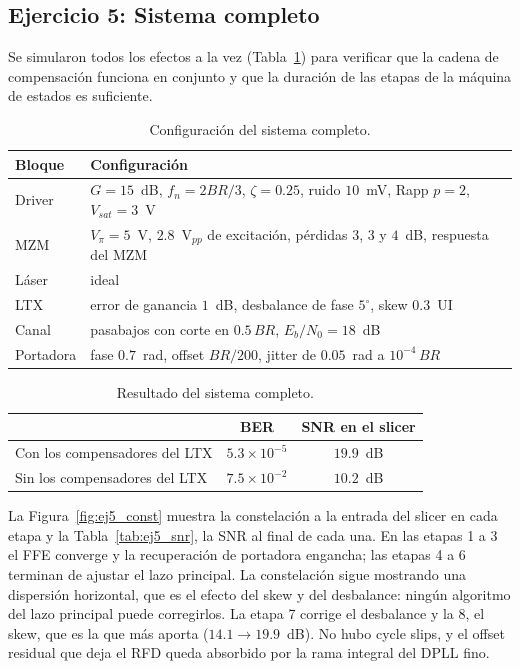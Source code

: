 \subsection*{Ejercicio 5: Sistema completo}

Se simularon todos los efectos a la vez (Tabla~\ref{tab:ej5_cfg}) para
verificar que la cadena de compensación funciona en conjunto y que la
duración de las etapas de la máquina de estados es suficiente.

\begin{table}[H]
\centering
\small
\begin{tabular}{ll}
\toprule
Bloque & Configuración \\
\midrule
Driver  & $G = 15$~dB, $f_n = 2BR/3$, $\zeta = 0.25$, ruido $10$~mV, Rapp $p = 2$, $V_{sat} = 3$~V \\
MZM     & $V_\pi = 5$~V, $2.8$~V$_{pp}$ de excitación, pérdidas $3$, $3$ y $4$~dB, respuesta del MZM \\
Láser   & ideal \\
LTX     & error de ganancia $1$~dB, desbalance de fase $5^\circ$, skew $0.3$~UI \\
Canal   & pasabajos con corte en $0.5\,BR$, $E_b/N_0 = 18$~dB \\
Portadora & fase $0.7$~rad, offset $BR/200$, jitter de $0.05$~rad a $10^{-4}\,BR$ \\
\bottomrule
\end{tabular}
\caption{Configuración del sistema completo.}
\label{tab:ej5_cfg}
\end{table}

\begin{table}[H]
\centering
\small
\begin{tabular}{lcc}
\toprule
& BER & SNR en el slicer \\
\midrule
Con los compensadores del LTX & $5.3\times10^{-5}$ & $19.9$~dB \\
Sin los compensadores del LTX & $7.5\times10^{-2}$ & $10.2$~dB \\
\bottomrule
\end{tabular}
\caption{Resultado del sistema completo.}
\label{tab:ej5_res}
\end{table}

La Figura~\ref{fig:ej5_const} muestra la constelación a la entrada del
slicer en cada etapa y la Tabla~\ref{tab:ej5_snr}, la SNR al final de
cada una. En las etapas 1 a 3 el FFE converge y la recuperación de
portadora engancha; las etapas 4 a 6 terminan de ajustar el lazo
principal. La constelación sigue mostrando una dispersión horizontal, que
es el efecto del skew y del desbalance: ningún algoritmo del lazo
principal puede corregirlos. La etapa 7 corrige el desbalance y la 8, el
skew, que es la que más aporta ($14.1 \rightarrow 19.9$~dB). No hubo
cycle slips, y el offset residual que deja el RFD queda absorbido por la
rama integral del DPLL fino.

